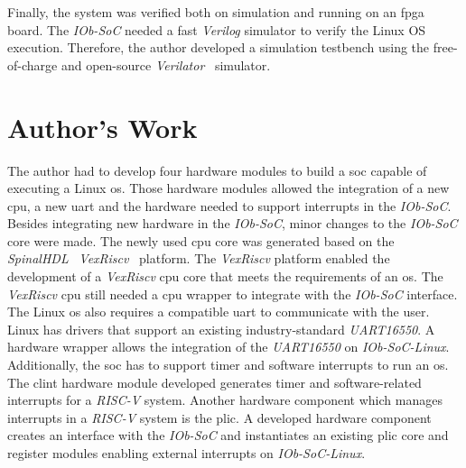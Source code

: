Finally, the system was verified both on simulation and running on an \acrshort{fpga} board. The \textit{IOb-SoC} needed a fast \textit{Verilog} simulator to verify the Linux OS execution. Therefore, the author developed a simulation testbench using the free-of-charge and open-source \textit{Verilator}~\cite{snyder2010verilator} simulator.

\section{Author's Work}
\label{section:authors_work}
The author had to develop four hardware modules to build a \acrfull{soc} capable of executing a Linux \acrshort{os}. Those hardware modules allowed the integration of a new \acrshort{cpu}, a new \acrshort{uart} and the hardware needed to support interrupts in the \textit{IOb-SoC}. Besides integrating new hardware in the \textit{IOb-SoC}, minor changes to the \textit{IOb-SoC} core were made. The newly used \acrshort{cpu} core was generated based on the \textit{SpinalHDL}~\cite{papon2017spinalhdl} \textit{VexRiscv}~\cite{vexriscv} platform. The \textit{VexRiscv} platform enabled the development of a \textit{VexRiscv} \acrshort{cpu} core that meets the requirements of an \acrshort{os}. The \textit{VexRiscv} \acrshort{cpu} still needed a \acrshort{cpu} wrapper to integrate with the \textit{IOb-SoC} interface. The Linux \acrshort{os} also requires a compatible \acrshort{uart} to communicate with the user. Linux has drivers that support an existing industry-standard \textit{UART16550}. A hardware wrapper allows the integration of the \textit{UART16550} on \textit{IOb-SoC-Linux}. Additionally, the \acrshort{soc} has to support timer and software interrupts to run an \acrshort{os}. The \acrshort{clint} hardware module developed generates timer and software-related interrupts for a \textit{RISC-V} system. Another hardware component which manages interrupts in a \textit{RISC-V} system is the \acrshort{plic}. A developed hardware component creates an interface with the \textit{IOb-SoC} and instantiates an existing \acrshort{plic} core and register modules enabling external interrupts on \textit{IOb-SoC-Linux}.


